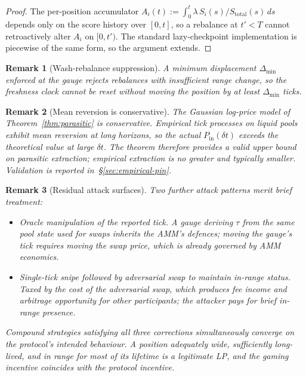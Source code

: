 \documentclass[11pt,a4paper]{article}
\theoremstyle{cgdefinition}
\theoremstyle{cgplain}
\theoremstyle{cgremark}
\newtheorem{remark}{Remark}
\begin{document}
\begin{proof}
The per-position accumulator $A_i(t) := \int_0^t \lambda\,S_i(s)/S_{\text{total}}(s)\,ds$ depends only on the score history over $[0, t]$, so a rebalance at $t' < T$ cannot retroactively alter $A_i$ on $[0, t')$. The standard lazy-checkpoint implementation is piecewise of the same form, so the argument extends.
\end{proof}

\begin{remark}[Wash-rebalance suppression]\label{rem:wash}
A minimum displacement $\Delta_{\min}$ enforced at the gauge rejects rebalances with insufficient range change, so the freshness clock cannot be reset without moving the position by at least $\Delta_{\min}$ ticks.
\end{remark}

\begin{remark}[Mean reversion is conservative]\label{rem:meanrev}
The Gaussian log-price model of Theorem~\ref{thm:parasitic} is conservative. Empirical tick processes on liquid pools exhibit mean reversion at long horizons, so the actual $P_{\text{in}}(\delta t)$ exceeds the theoretical value at large $\delta t$. The theorem therefore provides a valid upper bound on parasitic extraction; empirical extraction is no greater and typically smaller. Validation is reported in~\S\ref{sec:empirical-pin}.
\end{remark}

\begin{remark}[Residual attack surfaces]\label{rem:residual-attacks}
Two further attack patterns merit brief treatment:
\begin{itemize}[leftmargin=2em,nosep]
\item \emph{Oracle manipulation of the reported tick.} A gauge deriving $\tau$ from the same pool state used for swaps inherits the AMM's defences; moving the gauge's tick requires moving the swap price, which is already governed by AMM economics.
\item \emph{Single-tick snipe followed by adversarial swap to maintain in-range status.} Taxed by the cost of the adversarial swap, which produces fee income and arbitrage opportunity for other participants; the attacker pays for brief in-range presence.
\end{itemize}
Compound strategies satisfying all three corrections simultaneously converge on the protocol's intended behaviour. A position adequately wide, sufficiently long-lived, and in range for most of its lifetime is a legitimate LP, and the gaming incentive coincides with the protocol incentive.
\end{remark}
\end{document}
